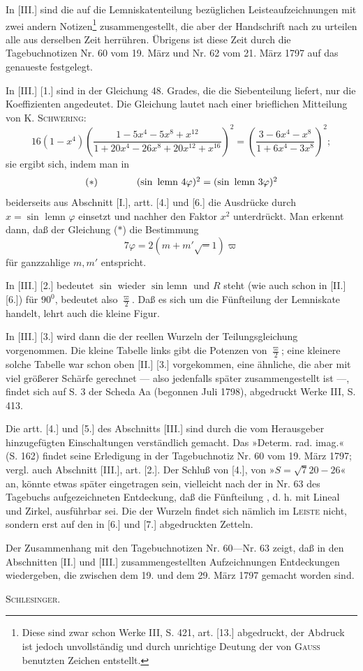 In [III.] sind die auf die Lemniskatenteilung bezüglichen Leisteaufzeichnungen mit zwei andern Notizen\footnote{Diese sind zwar schon Werke III, S. 421, art. [13.] abgedruckt, der Abdruck ist jedoch unvollständig und durch unrichtige Deutung der von \textsc{Gauss} benutzten Zeichen entstellt.\ClosingRule} zusammengestellt, die aber der Handschrift nach zu urteilen alle aus derselben Zeit herrühren. Übrigens ist diese Zeit durch die Tagebuchnotizen Nr. 60 vom 19. März und Nr. 62 vom 21. März 1797 auf das genaueste festgelegt.

In [III.] [1.] sind in der Gleichung 48. Grades, die die Siebenteilung liefert, nur die Koeffizienten angedeutet. Die Gleichung lautet nach einer brieflichen Mitteilung von \textsc{K. Schwering}:
{\small\[16(1-x^4)\left(\frac{1-5x^4-5x^8+x^{12}}{1+20x^4-26x^8+20x^{12}+x^{16}}\right)^2=\left(\frac{3-6x^4-x^8}{1+6x^4-3x^8}\right)^2;\]}
\noindent sie ergibt sich, indem man in
\[\begin{array}{l@{\qquad\qquad}c}(\ast)&(\sin\text{ lemn }4\varphi)^2=(\sin\text{ lemn }3\varphi)^2\end{array}\]
beiderseits aus Abschnitt [I.], artt. [4.] und [6.] die Ausdrücke durch \(x=\sin\text{ lemn }\varphi\) einsetzt und nachher den Faktor \(x^2\) unterdrückt. Man erkennt dann, daß der Gleichung (\(\ast\)) die Bestimmung
\[7\varphi=2(m+m'\surd-1)\varpi\]
für ganzzahlige \(m,m'\) entspricht.

In [III.] [2.] bedeutet \(\sin\) wieder \(\sin\text{ lemn}\) und \(R\) steht (wie auch schon in [II.] [6.]) für \(90^0\), bedeutet also \(\frac{\varpi}{2}\). Daß es sich um die Fünfteilung der Lemniskate handelt, lehrt auch die kleine Figur.

In [III.] [3.] wird dann die  der reellen Wurzeln der Teilungsgleichung vorgenommen. Die kleine Tabelle links gibt die Potenzen von \(\frac{\varpi}{2}\); eine kleinere solche Tabelle war schon oben [II.] [3.] vorgekommen, eine ähnliche, die aber mit viel größerer Schärfe gerechnet --- also jedenfalls später zusammengestellt ist ---, findet sich auf S. 3 der Scheda Aa (begonnen Juli 1798), abgedruckt Werke III, S. 413.

Die artt. [4.] und [5.] des Abschnitts [III.] sind durch die vom Herausgeber hinzugefügten Einschaltungen verständlich gemacht. Das »Determ. rad. imag.« (S. 162) findet seine Erledigung in der Tagebuchnotiz Nr. 60 vom 19. März 1797; vergl. auch Abschnitt [III.], art. [2.]. Der Schluß von [4.], von »\(S=\surd720-26\)« an, könnte etwas später eingetragen sein, vielleicht nach der in Nr. 63 des Tagebuchs aufgezeichneten Entdeckung, daß die Fünfteilung , d. h. mit Lineal und Zirkel, ausführbar sei. Die  der Wurzeln findet sich nämlich im \textsc{Leiste} nicht, sondern erst auf den in [6.] und [7.] abgedruckten Zetteln.

Der Zusammenhang mit den Tagebuchnotizen Nr. 60---Nr. 63 zeigt, daß in den Abschnitten [II.] und [III.] zusammengestellten Aufzeichnungen Entdeckungen wiedergeben, die zwischen dem 19. und dem 29. März 1797 gemacht worden sind.
\begin{flushright}\textsc{Schlesinger.}\end{flushright}
\clearpage
\endgroup

